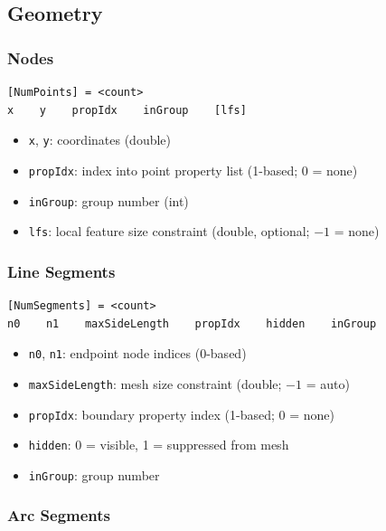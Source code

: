 \documentclass[11pt]{article}
\begin{document}
\subsection{Geometry}

\subsubsection{Nodes}

\begin{lstlisting}
[NumPoints] = <count>
x    y    propIdx    inGroup    [lfs]
\end{lstlisting}

\begin{itemize}[nosep]
  \item \texttt{x}, \texttt{y}: coordinates (double)
  \item \texttt{propIdx}: index into point property list (1-based; 0 = none)
  \item \texttt{inGroup}: group number (int)
  \item \texttt{lfs}: local feature size constraint (double, optional; $-1$ = none)
\end{itemize}

\subsubsection{Line Segments}

\begin{lstlisting}
[NumSegments] = <count>
n0    n1    maxSideLength    propIdx    hidden    inGroup
\end{lstlisting}

\begin{itemize}[nosep]
  \item \texttt{n0}, \texttt{n1}: endpoint node indices (0-based)
  \item \texttt{maxSideLength}: mesh size constraint (double; $-1$ = auto)
  \item \texttt{propIdx}: boundary property index (1-based; 0 = none)
  \item \texttt{hidden}: 0 = visible, 1 = suppressed from mesh
  \item \texttt{inGroup}: group number
\end{itemize}

\subsubsection{Arc Segments}
\end{document}
